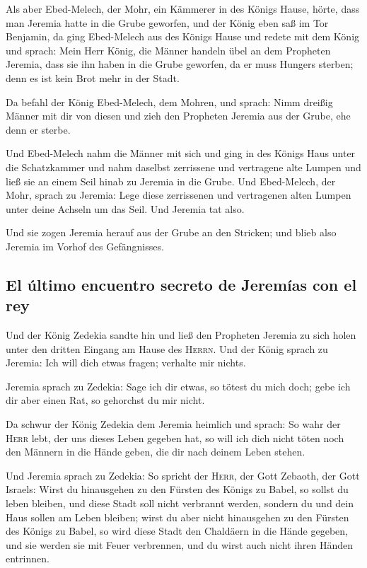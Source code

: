 Als aber Ebed-Melech, der Mohr, ein Kämmerer in des
Königs Hause, hörte, dass man Jeremia hatte in die Grube geworfen, und
der König eben saß im Tor Benjamin,  da ging Ebed-Melech
aus des Königs Hause und redete mit dem König und sprach: 
Mein Herr König, die Männer handeln übel an dem Propheten Jeremia, dass
sie ihn haben in die Grube geworfen, da er muss Hungers sterben; denn es
ist kein Brot mehr in der Stadt.

 Da befahl der König Ebed-Melech, dem Mohren, und sprach:
Nimm dreißig Männer mit dir von diesen und zieh den Propheten Jeremia
aus der Grube, ehe denn er sterbe.

 Und Ebed-Melech nahm die Männer mit sich und ging in des
Königs Haus unter die Schatzkammer und nahm daselbst zerrissene und
vertragene alte Lumpen und ließ sie an einem Seil hinab zu Jeremia in
die Grube.  Und Ebed-Melech, der Mohr, sprach zu Jeremia:
Lege diese zerrissenen und vertragenen alten Lumpen unter deine Achseln
um das Seil. Und Jeremia tat also.

 Und sie zogen Jeremia herauf aus der Grube an den
Stricken; und blieb also Jeremia im Vorhof des Gefängnisses.

\hypertarget{el-uxfaltimo-encuentro-secreto-de-jeremuxedas-con-el-rey}{%
\subsection{El último encuentro secreto de Jeremías con el
rey}\label{el-uxfaltimo-encuentro-secreto-de-jeremuxedas-con-el-rey}}

 Und der König Zedekia sandte hin und ließ den Propheten
Jeremia zu sich holen unter den dritten Eingang am Hause des
\textsc{Herrn}. Und der König sprach zu Jeremia: Ich will dich etwas
fragen; verhalte mir nichts.

 Jeremia sprach zu Zedekia: Sage ich dir etwas, so tötest
du mich doch; gebe ich dir aber einen Rat, so gehorchst du mir nicht.

 Da schwur der König Zedekia dem Jeremia heimlich und
sprach: So wahr der \textsc{Herr} lebt, der uns dieses Leben gegeben
hat, so will ich dich nicht töten noch den Männern in die Hände geben,
die dir nach deinem Leben stehen.

 Und Jeremia sprach zu Zedekia: So spricht der
\textsc{Herr}, der Gott Zebaoth, der Gott Israels: Wirst du hinausgehen
zu den Fürsten des Königs zu Babel, so sollst du leben bleiben, und
diese Stadt soll nicht verbrannt werden, sondern du und dein Haus sollen
am Leben bleiben;  wirst du aber nicht hinausgehen zu den
Fürsten des Königs zu Babel, so wird diese Stadt den Chaldäern in die
Hände gegeben, und sie werden sie mit Feuer verbrennen, und du wirst
auch nicht ihren Händen entrinnen.

